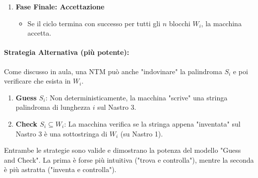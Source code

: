 \documentclass[a4paper]{article}
\begin{document}
\begin{enumerate}
    \item \textbf{Fase Finale: Accettazione}
        \begin{itemize}
            \item Se il ciclo termina con successo per tutti gli $n$ blocchi $W_i$, la macchina accetta.
        \end{itemize}
\end{enumerate}

\paragraph{Strategia Alternativa (più potente):} Come discusso in aula, una NTM può anche "indovinare" la palindroma $S_i$ e poi verificare che esista in $W_i$.
\begin{enumerate}
    \item \textbf{Guess $S_i$}: Non deterministicamente, la macchina "scrive" una stringa palindroma di lunghezza $i$ sul Nastro 3.
    \item \textbf{Check $S_i \subseteq W_i$}: La macchina verifica se la stringa appena "inventata" sul Nastro 3 è una sottostringa di $W_i$ (su Nastro 1).
\end{enumerate}
Entrambe le strategie sono valide e dimostrano la potenza del modello "Guess and Check". La prima è forse più intuitiva ("trova e controlla"), mentre la seconda è più astratta ("inventa e controlla").
\end{document}
